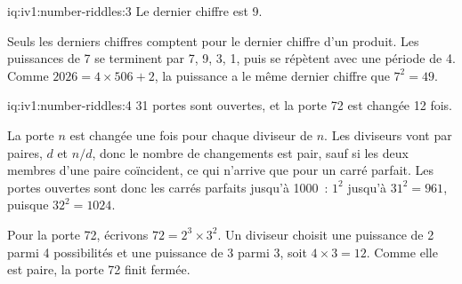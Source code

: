 \begin{solution}{iq:iv1:number-riddles:3}
Le dernier chiffre est 9.

Seuls les derniers chiffres comptent pour le dernier chiffre d'un produit. Les puissances de 7 se terminent par 7, 9, 3, 1, puis se répètent avec une période de 4. Comme $2026 = 4 \times 506 + 2$, la puissance a le même dernier chiffre que $7^2 = 49$.

\end{solution}

\begin{solution}{iq:iv1:number-riddles:4}
31 portes sont ouvertes, et la porte 72 est changée 12 fois.

La porte $n$ est changée une fois pour chaque diviseur de $n$. Les diviseurs vont par paires, $d$ et $n/d$, donc le nombre de changements est pair, sauf si les deux membres d'une paire coïncident, ce qui n'arrive que pour un carré parfait. Les portes ouvertes sont donc les carrés parfaits jusqu'à 1000~: $1^2$ jusqu'à $31^2 = 961$, puisque $32^2 = 1024$.

Pour la porte 72, écrivons $72 = 2^3 \times 3^2$. Un diviseur choisit une puissance de 2 parmi 4 possibilités et une puissance de 3 parmi 3, soit $4 \times 3 = 12$. Comme elle est paire, la porte 72 finit fermée.

\end{solution}

